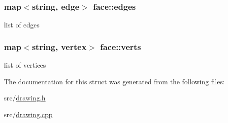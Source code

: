 \subsubsection[{\texorpdfstring{edges}{edges}}]{\setlength{\rightskip}{0pt plus 5cm}map$<$string, {\bf edge}$>$ face\+::edges}\hypertarget{structface_ac8a0c9860a641b73d3bbcdf18e18df14}{}\label{structface_ac8a0c9860a641b73d3bbcdf18e18df14}
list of edges 
\subsubsection[{\texorpdfstring{verts}{verts}}]{\setlength{\rightskip}{0pt plus 5cm}map$<$string, {\bf vertex}$>$ face\+::verts}\hypertarget{structface_a44e0350b6d4ce9dc74b611944e40fbbf}{}\label{structface_a44e0350b6d4ce9dc74b611944e40fbbf}
list of vertices 

The documentation for this struct was generated from the following files\+:\begin{DoxyCompactItemize}
\item 
src/\hyperlink{drawing_8h}{drawing.\+h}\item 
src/\hyperlink{drawing_8cpp}{drawing.\+cpp}\end{DoxyCompactItemize}
